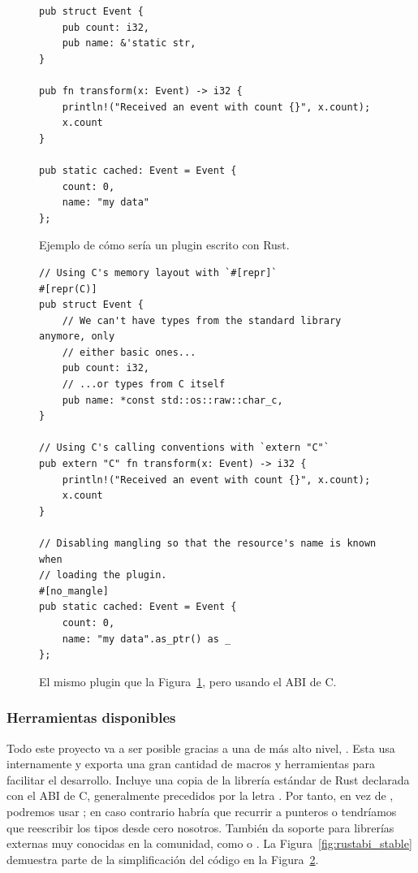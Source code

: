 \begin{figure}
    \centering
    \begin{verbatim}
pub struct Event {
    pub count: i32,
    pub name: &'static str,
}

pub fn transform(x: Event) -> i32 {
    println!("Received an event with count {}", x.count);
    x.count
}

pub static cached: Event = Event {
    count: 0,
    name: "my data"
};
    \end{verbatim}

    \caption{Ejemplo de cómo sería un plugin escrito con Rust.}%
    \label{fig:rustpure}
\end{figure}

\begin{figure}
    \centering
    \begin{verbatim}
// Using C's memory layout with `#[repr]`
#[repr(C)]
pub struct Event {
    // We can't have types from the standard library anymore, only
    // either basic ones...
    pub count: i32,
    // ...or types from C itself
    pub name: *const std::os::raw::char_c,
}

// Using C's calling conventions with `extern "C"`
pub extern "C" fn transform(x: Event) -> i32 {
    println!("Received an event with count {}", x.count);
    x.count
}

// Disabling mangling so that the resource's name is known when
// loading the plugin.
#[no_mangle]
pub static cached: Event = Event {
    count: 0,
    name: "my data".as_ptr() as _
};
    \end{verbatim}

    \caption{El mismo plugin que la Figura~\ref{fig:rustpure}, pero usando el
    ABI de C.}%
    \label{fig:rustffi}
\end{figure}

\subsubsection{Herramientas disponibles}

Todo este proyecto va a ser posible gracias a una \crate de más alto nivel,
. Esta usa  internamente y exporta una
gran cantidad de macros y herramientas para facilitar el desarrollo. Incluye una
copia de la librería estándar de Rust declarada con el ABI de C, generalmente
precedidos por la letra . Por tanto, en vez de , podremos
usar ; en caso contrario habría que recurrir a punteros
 o tendríamos que reescribir los tipos desde cero nosotros.
También da soporte para librerías externas muy conocidas en la comunidad, como
 o . La
Figura~\ref{fig:rustabi_stable} demuestra parte de la simplificación del código
en la Figura~\ref{fig:rustffi}.

